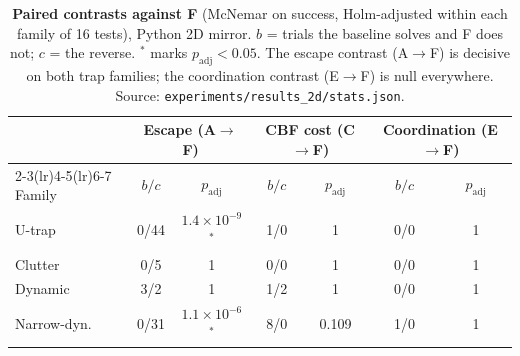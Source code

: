 \begin{table}[t]
\centering
\caption{\textbf{Paired contrasts against F} (McNemar on success, Holm-adjusted within each family of 16 tests), Python 2D mirror. $b$ = trials the baseline solves and F does not; $c$ = the reverse. $^{*}$ marks $p_{\mathrm{adj}}<0.05$. The escape contrast (A$\to$F) is decisive on both trap families; the coordination contrast (E$\to$F) is null everywhere. Source: \texttt{experiments/results\_2d/stats.json}.}
\label{tab:contrasts}
\small
\begin{tabular}{lcccccc}
\toprule
 & \multicolumn{2}{c}{Escape (A$\to$F)} & \multicolumn{2}{c}{CBF cost (C$\to$F)} & \multicolumn{2}{c}{Coordination (E$\to$F)} \\
\cmidrule(lr){2-3}\cmidrule(lr){4-5}\cmidrule(lr){6-7}
Family & $b/c$ & $p_{\mathrm{adj}}$ & $b/c$ & $p_{\mathrm{adj}}$ & $b/c$ & $p_{\mathrm{adj}}$ \\
\midrule
U-trap & 0/44 & $1.4\!\times\!10^{-9}$$^{*}$ & 1/0 & 1 & 0/0 & 1 \\
Clutter & 0/5 & 1 & 0/0 & 1 & 0/0 & 1 \\
Dynamic & 3/2 & 1 & 1/2 & 1 & 0/0 & 1 \\
Narrow-dyn. & 0/31 & $1.1\!\times\!10^{-6}$$^{*}$ & 8/0 & 0.109 & 1/0 & 1 \\
\bottomrule
\end{tabular}
\end{table}
